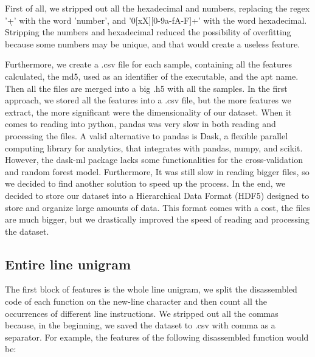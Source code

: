 First of all, we stripped out all the hexadecimal and numbers, replacing the regex '\d+' with the word 'number', and '0[xX][0-9a-fA-F]+' with the word hexadecimal. Stripping the numbers and hexadecimal reduced the possibility of overfitting because some numbers may be unique, and that would create a useless feature.

Furthermore, we create a .csv file for each sample, containing all the features calculated, the md5, used as an identifier of the executable, and the apt name. Then all the files are merged into a big .h5 with all the samples. 
In the first approach, we stored all the features into a .csv file, but the more features we extract, the more significant were the dimensionality of our dataset. When it comes to reading into python, pandas was very slow in both reading and processing the files.
A valid alternative to pandas is Dask, a flexible parallel computing library for analytics, that integrates with pandas,  numpy, and scikit. However, the dask-ml package lacks some functionalities for the cross-validation and random forest model. Furthermore, It was still slow in reading bigger files, so we decided to find another solution to speed up the process.
In the end, we decided to store our dataset into a Hierarchical Data Format (HDF5) designed to store and organize large amounts of data. This format comes with a cost, the files are much bigger, but we drastically improved the speed of reading and processing the dataset.

\subsection{Entire line unigram}
The first block of features is the whole line unigram, we split the disassembled code of each function on the new-line character and then count all the occurrences of different line instructions. We stripped out all the commas because, in the beginning, we saved the dataset to .csv with comma as a separator. For example, the features of the following disassembled function would be:

